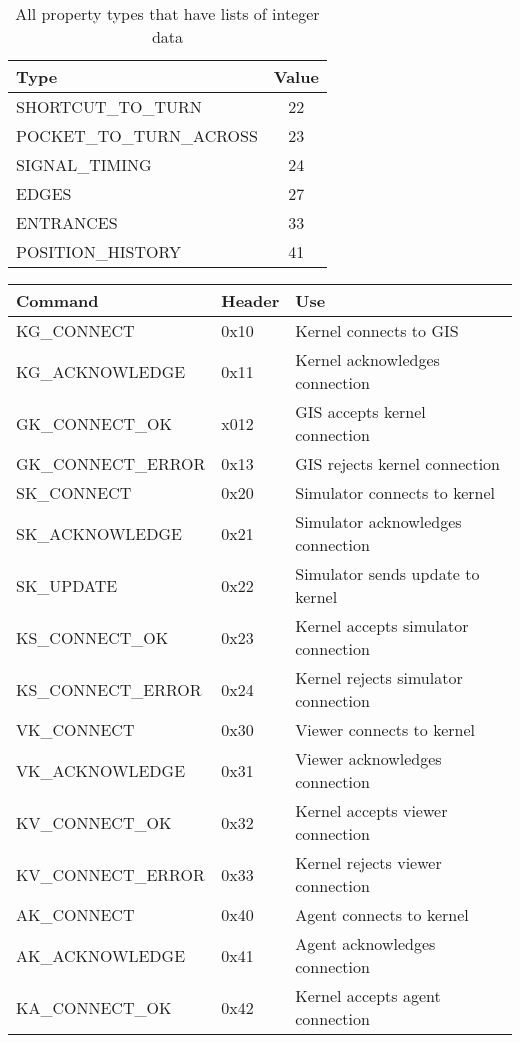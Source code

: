\begin{table}[pht]
\center
\begin{tabular}{|lc|}
\hline
Type & Value \\
\hline
SHORTCUT\_TO\_TURN & 22 \\
POCKET\_TO\_TURN\_ACROSS & 23 \\
SIGNAL\_TIMING & 24 \\
EDGES & 27 \\
ENTRANCES & 33 \\
POSITION\_HISTORY & 41 \\
\hline
\end{tabular}
\caption{All property types that have lists of integer data}
\label{table_int_list_property_types}
\end{table}

\begin{table}[pht]
\center
\begin{tabular}{|l|l|l|}
\hline
Command & Header & Use\\
\hline
KG\_CONNECT & 0x10 & Kernel connects to GIS\\
KG\_ACKNOWLEDGE & 0x11 & Kernel acknowledges connection\\
GK\_CONNECT\_OK & x012 & GIS accepts kernel connection\\
GK\_CONNECT\_ERROR & 0x13 & GIS rejects kernel connection\\
\hline
SK\_CONNECT & 0x20 & Simulator connects to kernel\\
SK\_ACKNOWLEDGE & 0x21 & Simulator acknowledges connection\\
SK\_UPDATE & 0x22 & Simulator sends update to kernel\\
KS\_CONNECT\_OK & 0x23 & Kernel accepts simulator connection\\
KS\_CONNECT\_ERROR & 0x24 & Kernel rejects simulator connection\\
\hline
VK\_CONNECT & 0x30 & Viewer connects to kernel\\
VK\_ACKNOWLEDGE & 0x31 & Viewer acknowledges connection\\
KV\_CONNECT\_OK & 0x32 & Kernel accepts viewer connection\\
KV\_CONNECT\_ERROR & 0x33 & Kernel rejects viewer connection\\
\hline
AK\_CONNECT & 0x40 & Agent connects to kernel\\
AK\_ACKNOWLEDGE & 0x41 & Agent acknowledges connection\\
KA\_CONNECT\_OK & 0x42 & Kernel accepts agent connection\\

\end{tabular}
\end{table}
